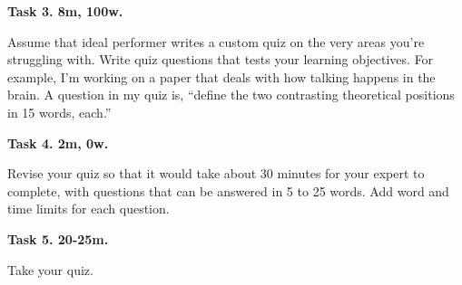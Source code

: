 \documentclass[
]{book}
\begin{document}
\textbf{Task 3. 8m, 100w.}

Assume that ideal performer writes a custom quiz on
the very areas you're struggling with.
Write quiz questions that tests your learning objectives.
For example, I'm working on a paper that deals with
how talking happens in the brain.
A question in my quiz is, ``define the two contrasting theoretical
positions in 15 words, each.''

\textbf{Task 4. 2m, 0w.}

Revise your quiz so that it would take about 30 minutes for your expert to complete, with questions that can be answered in 5 to 25 words.
Add word and time limits for each question.

\textbf{Task 5. 20-25m.}

Take your quiz.

  
\end{document}
